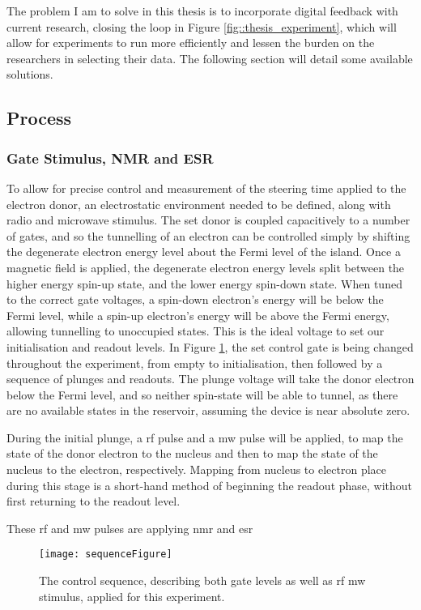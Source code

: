 The problem I am to solve in this thesis is to incorporate digital feedback with current research, closing the loop in Figure \ref{fig::thesis_experiment}, which will allow for experiments to run more efficiently and lessen the burden on the researchers in selecting their data. The following section will detail some available solutions.

\subsection{Process}

	\subsubsection{Gate Stimulus, NMR and ESR}
	To allow for precise control and measurement of the steering time applied to the electron donor, an electrostatic environment needed to be defined, along with radio and microwave stimulus. The \gls{set} donor is coupled capacitively to a number of gates, and so the tunnelling of an electron can be controlled simply by shifting the degenerate electron energy level about the Fermi level of the island. Once a magnetic field is applied, the degenerate electron energy levels split between the higher energy spin-up state, and the lower energy spin-down state. When tuned to the correct gate voltages, a spin-down electron's energy will be below the Fermi level, while a spin-up electron's energy will be above the Fermi energy, allowing tunnelling to unoccupied states. This is the ideal voltage to set our initialisation and readout levels. In Figure \ref{fig::sequence}, the \gls{set} control gate is being changed throughout the experiment, from empty to initialisation, then followed by a sequence of plunges and readouts. The plunge voltage will take the donor electron below the Fermi level, and so neither spin-state will be able to tunnel, as there are no available states in the reservoir, assuming the device is near absolute zero.
	
	During the initial plunge, a \gls{rf} pulse and a \gls{mw} pulse will be applied, to map the state of the donor electron to the nucleus and then to map the state of the nucleus to the electron, respectively. Mapping from nucleus to electron place during this stage is a short-hand method of beginning the readout phase, without first returning to the readout level.
	
	These \gls{rf} and \gls{mw} pulses are applying \gls{nmr} and \gls{esr}
	
	
	
	\begin{figure}[htbp!]
		\centering
		\texttt{[image: sequenceFigure]}
		\caption{The control sequence, describing both gate levels as well as \gls{rf} \gls{mw} stimulus, applied for this experiment.}
		\label{fig::sequence}
	\end{figure}
	